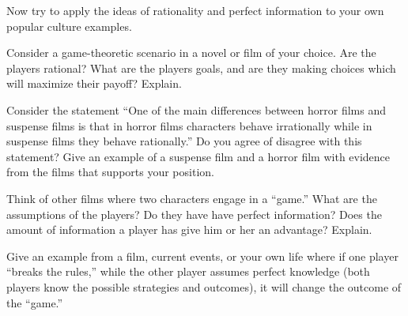 Now try to apply the ideas of rationality and perfect information to your own popular culture examples.


\begin{writing}
Consider a game-theoretic scenario in a novel or film of your choice. Are the players rational? What are the players goals, and are they making choices which will maximize their payoff? Explain.
\end{writing}

\begin{writing}
Consider the statement ``One of the main differences between horror films and suspense films is that in horror films characters behave irrationally while in suspense films they behave rationally.'' Do you agree of disagree with this statement? Give an example of a suspense film and a horror film with evidence from the films that supports your position.
\end{writing}

\begin{writing}
Think of other films where two characters engage in a ``game.'' What are the assumptions of the players? Do they have have perfect information? Does the amount of information a player has give him or her an advantage?  Explain.
\end{writing}


\begin{writing}
Give an example from a film, current events, or your own life where if one player ``breaks the rules,'' while the other player assumes perfect knowledge (both players know the possible strategies and outcomes), it will change the outcome of the ``game.''
\end{writing}






 